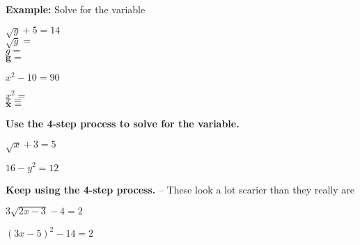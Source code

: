 \documentclass[12pt]{article}
\begin{document}
\textbf{Example:} Solve for the variable\\

\begin{multicols}{2}

$\sqrt{g}+5=14$\\

$\sqrt{g}=$\\

$g=$\\

$\mathbf{g=}$\\

\vfill

\columnbreak

$x^2-10=90$

$x^2=$\\

$x=$\\

$\mathbf{x=}$\\

\end{multicols}

\textbf{Use the 4-step process to solve for the variable.}\\


\begin{enumerate}
\begin{multicols}{2}
	\item $\sqrt{x}+3=5$\\
	
	
	\item $16-y^2=12$\\
\end{multicols}		
\end{enumerate}

\vspace{1in}

\textbf{Keep using the 4-step process.} -- These look a lot scarier than they really are\\


\begin{enumerate}[resume] 
\begin{multicols}{2}
	\item $3\sqrt{2x-3}-4=2$\\
	
		
	\item $(3x-5)^2-14=2$\\

\end{multicols}
\end{enumerate}
\end{document}
